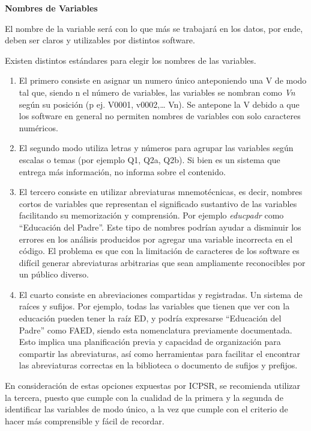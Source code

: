 \documentclass[
  spanish,
  a4paper,
  oneside]{scrbook}
\begin{document}
\textbf{Nombres de Variables}

El nombre de la variable será con lo que más se trabajará en los datos,
por ende, deben ser claros y utilizables por distintos software.

Existen distintos estándares para elegir los nombres de las variables.

\begin{enumerate}
\def\labelenumi{\arabic{enumi}.}
\item
  El primero consiste en asignar un numero único anteponiendo una V de
  modo tal que, siendo n el número de variables, las variables se
  nombran como \emph{Vn} según su posición (p ej. V0001, v0002,\ldots{}
  Vn). Se antepone la V debido a que los software en general no permiten
  nombres de variables con solo caracteres numéricos.
\item
  El segundo modo utiliza letras y números para agrupar las variables
  según escalas o temas (por ejemplo Q1, Q2a, Q2b). Si bien es un
  sistema que entrega más información, no informa sobre el contenido.
\item
  El tercero consiste en utilizar abreviaturas mnemotécnicas, es decir,
  nombres cortos de variables que representan el significado sustantivo
  de las variables facilitando su memorización y comprensión. Por
  ejemplo \emph{educpadr} como ``Educación del Padre''. Este tipo de
  nombres podrían ayudar a disminuir los errores en los análisis
  producidos por agregar una variable incorrecta en el código. El
  problema es que con la limitación de caracteres de los software es
  difícil generar abreviaturas arbitrarias que sean ampliamente
  reconocibles por un público diverso.
\item
  El cuarto consiste en abreviaciones compartidas y registradas. Un
  sistema de raíces y sufijos. Por ejemplo, todas las variables que
  tienen que ver con la educación pueden tener la raíz ED, y podría
  expresarse ``Educación del Padre'' como FAED, siendo esta nomenclatura
  previamente documentada. Esto implica una planificación previa y
  capacidad de organización para compartir las abreviaturas, así como
  herramientas para facilitar el encontrar las abreviaturas correctas en
  la biblioteca o documento de sufijos y prefijos.
\end{enumerate}

En consideración de estas opciones expuestas por ICPSR, se recomienda
utilizar la tercera, puesto que cumple con la cualidad de la primera y
la segunda de identificar las variables de modo único, a la vez que
cumple con el criterio de hacer más comprensible y fácil de recordar.
\end{document}
